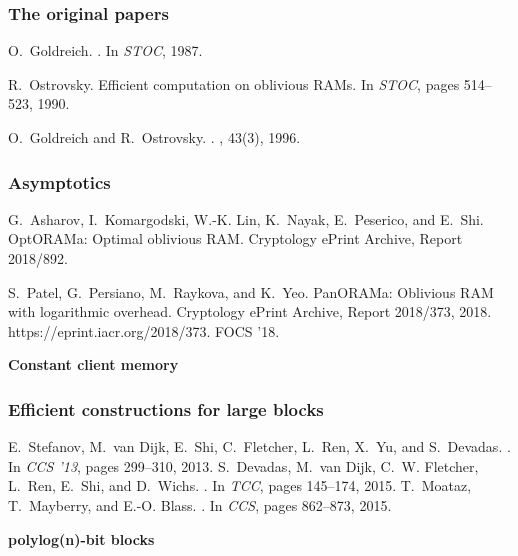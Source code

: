 \documentclass[]{beamer}
\begin{document}

\begin{frame}
\frametitle{The original papers}

\begin{thebibliography}{10}
O.~Goldreich.
.
\newblock In {\em STOC}, 1987.

R.~Ostrovsky.
\newblock Efficient computation on oblivious {RAM}s.
\newblock In {\em STOC}, pages 514--523, 1990.

O.~Goldreich and R.~Ostrovsky.
.
, 43(3), 1996.
\end{thebibliography}
\end{frame}

\begin{frame}
\frametitle{Asymptotics}

\begin{thebibliography}{10}
G.~Asharov, I.~Komargodski, W.-K. Lin, K.~Nayak, E.~Peserico, and E.~Shi.
\newblock Opt{ORAM}a: Optimal oblivious {RAM}.
\newblock Cryptology ePrint Archive, Report 2018/892.

S.~Patel, G.~Persiano, M.~Raykova, and K.~Yeo.
\newblock Pan{ORAM}a: Oblivious {RAM} with logarithmic overhead.
\newblock Cryptology ePrint Archive, Report 2018/373, 2018.
\newblock https://eprint.iacr.org/2018/373.
\newblock FOCS '18.
\end{thebibliography}

\vfill
{\color{brown} \bf Constant client memory}
\end{frame}

\begin{frame}
\frametitle{Efficient constructions for large blocks}
\begin{thebibliography}{10}
E.~Stefanov, M.~van Dijk, E.~Shi, C.~Fletcher, L.~Ren, X.~Yu, and S.~Devadas.
.
\newblock In {\em CCS '13}, pages 299--310, 2013.
S.~Devadas, M.~van Dijk, C.~W. Fletcher, L.~Ren, E.~Shi, and D.~Wichs.
.
\newblock In {\em TCC}, pages 145--174, 2015.
T.~Moataz, T.~Mayberry, and E.-O. Blass.
.
\newblock In {\em CCS}, pages 862--873, 2015.
\end{thebibliography}

\vfill
{\color{brown} \bf polylog(n)-bit blocks}

\end{frame}
\end{document}
